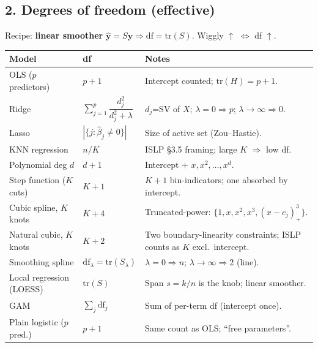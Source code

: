 \footnotesize


\subsection*{2. Degrees of freedom (effective)}

Recipe: \textbf{linear smoother} $\hat{\mathbf y}=S\mathbf y \Rightarrow \mathrm{df}=\mathrm{tr}(S)$. Wiggly $\uparrow$ $\Leftrightarrow$ df $\uparrow$.

\scriptsize
\begin{tabularx}{\linewidth}{@{}l l X@{}}
\toprule
\textbf{Model} & \textbf{df} & \textbf{Notes} \\
\midrule
OLS ($p$ predictors)    & $p+1$               & Intercept counted; $\mathrm{tr}(H)=p+1$. \\
Ridge                   & $\sum_{j=1}^p \dfrac{d_j^2}{d_j^2+\lambda}$ & $d_j$=SV of $X$; $\lambda{=}0\!\Rightarrow\!p$; $\lambda{\to}\infty\!\Rightarrow\!0$. \\
Lasso                   & $|\{j:\hat\beta_j\ne 0\}|$ & Size of active set (Zou--Hastie). \\
KNN regression          & $n/K$               & ISLP \S3.5 framing; large $K$ $\Rightarrow$ low df. \\
Polynomial deg $d$      & $d+1$               & Intercept $+$ $x,x^2,\dots,x^d$. \\
Step function ($K$ cuts) & $K+1$              & $K{+}1$ bin-indicators; one absorbed by intercept. \\
Cubic spline, $K$ knots & $K+4$               & Truncated-power: $\{1,x,x^2,x^3,(x{-}c_j)^3_+\}$. \\
Natural cubic, $K$ knots & $K+2$              & Two boundary-linearity constraints; ISLP counts as $K$ excl.\ intercept. \\
Smoothing spline        & $\mathrm{df}_\lambda{=}\mathrm{tr}(S_\lambda)$ & $\lambda{=}0\!\Rightarrow\!n$; $\lambda{\to}\infty\!\Rightarrow\!2$ (line). \\
Local regression (LOESS) & $\mathrm{tr}(S)$         & Span $s{=}k/n$ is the knob; linear smoother. \\
GAM                     & $\sum_j \mathrm{df}_j$ & Sum of per-term df (intercept once). \\
Plain logistic ($p$ pred.) & $p+1$            & Same count as OLS; ``free parameters''. \\
\bottomrule
\end{tabularx}

